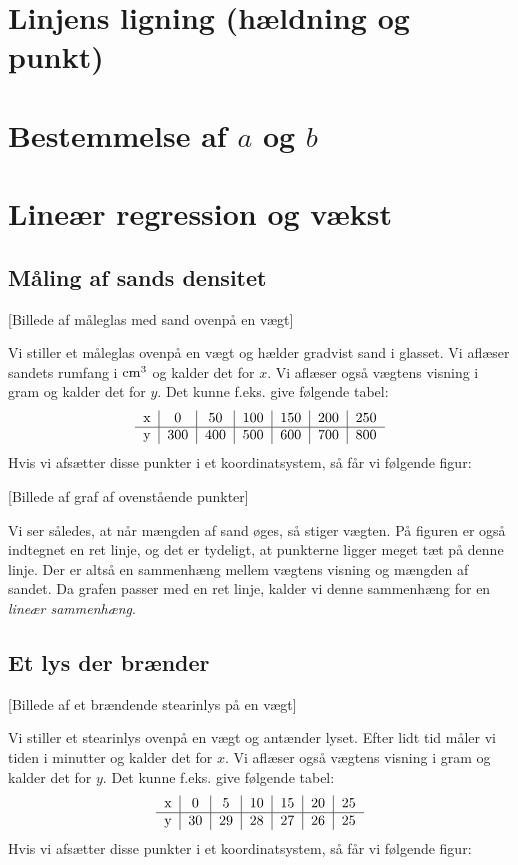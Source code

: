 \documentclass[12pt,oneside,a4paper]{article}
\begin{document}
\section{Linjens ligning (hældning og punkt)}
\section{Bestemmelse af $a$ og $b$}
\section{Lineær regression og vækst}
\subsection{Måling af sands densitet}
[Billede af måleglas med sand ovenpå en vægt]

Vi stiller et måleglas ovenpå en vægt og hælder gradvist sand i glasset. Vi
aflæser sandets rumfang i ${\rm cm}^3$ og kalder det for $x$. Vi aflæser også
vægtens visning i gram og kalder det for $y$. Det kunne f.eks. give følgende
tabel:
$$
\begin{tabular}{c|c|c|c|c|c|c}
    x &   0 &  50 & 100 & 150 & 200 & 250 \\
    \hline
    y & 300 & 400 & 500 & 600 & 700 & 800
\end{tabular}
$$
Hvis vi afsætter disse punkter i et koordinatsystem, så får vi følgende figur:

[Billede af graf af ovenstående punkter]

Vi ser således, at når mængden af sand øges, så stiger vægten. 
På figuren er også indtegnet en ret linje, og det er tydeligt, at punkterne
ligger meget tæt på denne linje.  Der er altså en sammenhæng mellem vægtens
visning og mængden af sandet. Da grafen passer med en ret linje, kalder vi
denne sammenhæng for en {\em lineær sammenhæng}.

\subsection{Et lys der brænder}
[Billede af et brændende stearinlys på en vægt]

Vi stiller et stearinlys ovenpå en vægt og antænder lyset. Efter lidt tid måler
vi tiden i minutter og kalder det for $x$. Vi aflæser også vægtens visning i
gram og kalder det for $y$. Det kunne f.eks. give følgende tabel:
$$
\begin{tabular}{c|c|c|c|c|c|c}
    x &  0 &  5 & 10 & 15 & 20 & 25 \\
    \hline
    y & 30 & 29 & 28 & 27 & 26 & 25
\end{tabular}
$$
Hvis vi afsætter disse punkter i et koordinatsystem, så får vi følgende figur:
\end{document}
